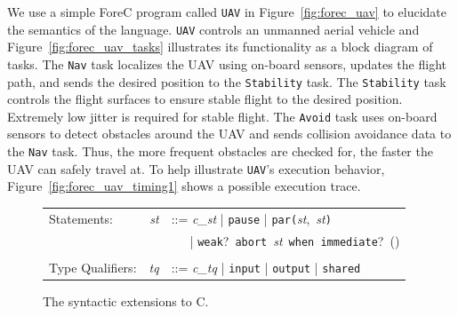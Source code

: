 We use a simple ForeC program called
\verb$UAV$ in Figure~\ref{fig:forec_uav} to elucidate the
semantics of the language. \verb$UAV$ controls an unmanned
aerial vehicle and Figure~\ref{fig:forec_uav_tasks}
illustrates its functionality as a block diagram of
tasks. The \verb$Nav$ task localizes the UAV using on-board
sensors, updates the flight path, and sends the desired
position to the \verb$Stability$ task. The \verb$Stability$
task controls the flight surfaces to ensure stable flight to
the desired position. Extremely low jitter is required for
stable flight. The \verb$Avoid$ task uses on-board sensors
to detect obstacles around the UAV and sends collision
avoidance data to the \verb$Nav$ task. Thus, the more
frequent obstacles are checked for, the faster the UAV can
safely travel at. To help illustrate \verb$UAV$'s execution
behavior, Figure~\ref{fig:forec_uav_timing1} shows a
possible execution trace.

\begin{figure}[t]
	\centering

	\renewcommand{\arraystretch}{1.25}
	\begin{tabular}{l r l}
		Statements:			& \emph{st} & ::= \emph{c\_st} | \verb$pause$ | \verb$par($\emph{st},~\emph{st}\verb$)$	\\
							&			& ~~~| \verb$weak$?~\verb$abort$~\emph{st}~\verb$when immediate$?~(\expression{})		\\
																																\\
		Type Qualifiers:	& \emph{tq}	& ::= \emph{c\_tq} | \verb$input$ | \verb$output$ | \verb$shared$
	\end{tabular}
	
	\caption{The syntactic extensions to C.}
	\label{fig:forec_syntax}
\end{figure}

